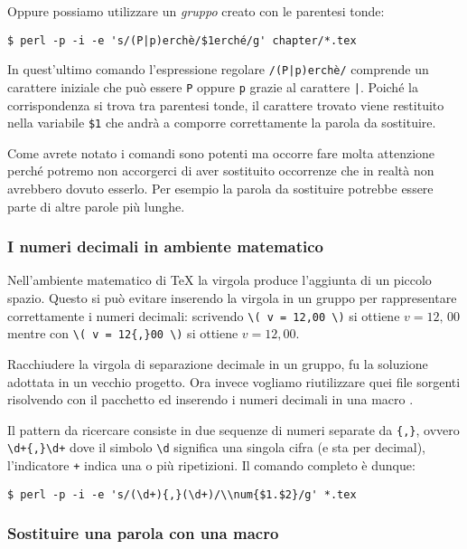 Oppure possiamo utilizzare un \emph{gruppo} creato con le parentesi tonde:
\begin{verbatim}
$ perl -p -i -e 's/(P|p)erchè/$1erché/g' chapter/*.tex
\end{verbatim}

In quest'ultimo comando l'espressione regolare \texttt{/(P|p)erchè/} comprende un carattere iniziale che può essere \texttt{P} oppure \texttt{p} grazie al carattere \texttt{|}. Poiché la corrispondenza si trova tra parentesi tonde, il carattere trovato viene restituito nella variabile \texttt{\$1} che andrà a comporre correttamente la parola da sostituire.

Come avrete notato i comandi sono potenti ma occorre fare molta attenzione perché potremo non accorgerci di aver sostituito occorrenze che in realtà non avrebbero dovuto esserlo. Per esempio la parola da sostituire potrebbe essere parte di altre parole più lunghe.

\subsubsection{I numeri decimali in ambiente matematico}

Nell'ambiente matematico di \TeX{} la virgola produce l'aggiunta di un piccolo spazio. Questo si può evitare inserendo la virgola in un gruppo per rappresentare correttamente i numeri decimali: scrivendo \verb!\( v = 12,00 \)! si ottiene \( v = 12,\, 00 \) mentre con \verb!\( v = 12{,}00 \)! si ottiene \( v = 12,00 \).

Racchiudere la virgola di separazione decimale in un gruppo, fu la soluzione adottata in un vecchio progetto. Ora invece vogliamo riutilizzare quei file sorgenti risolvendo con il pacchetto  ed inserendo i numeri decimali in una macro . 

Il pattern da ricercare consiste in due sequenze di numeri separate da \texttt{\{,\}}, ovvero \verb=\d+{,}\d+= dove il simbolo \verb=\d= significa una singola cifra (e sta per decimal), l'indicatore \texttt{+} indica una o più ripetizioni. Il comando completo è dunque:
\begin{verbatim}
$ perl -p -i -e 's/(\d+){,}(\d+)/\\num{$1.$2}/g' *.tex
\end{verbatim}



\subsubsection{Sostituire una parola con una macro}

